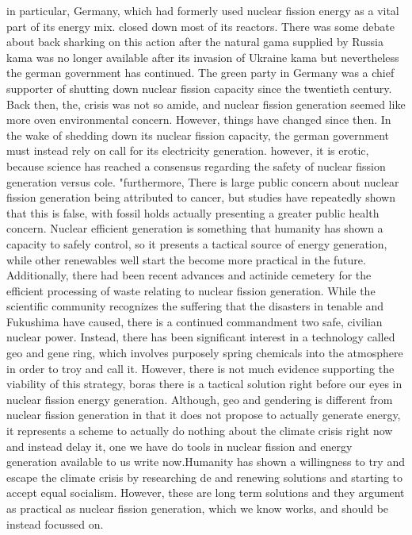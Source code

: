 \documentclass[12pt,letterpaper]{article}
\begin{document}
\begin{flushleft}
 in particular, Germany, which had formerly used nuclear fission energy as a vital part of its energy mix. closed down most of its reactors. There was some debate about back sharking on this action after the natural gama supplied by Russia kama was no longer available after its invasion of Ukraine kama but nevertheless the german government has continued. The green party in Germany was a chief supporter of shutting down nuclear fission capacity since the twentieth century. Back then, the, crisis was not so amide, and nuclear fission generation seemed like more oven environmental concern. However, things have changed since then. In the wake of shedding down its nuclear fission capacity, the german government must instead rely on call for its electricity generation. however, it is erotic, because science has reached a consensus regarding the safety of nuclear fission generation versus cole. "furthermore, There is large public concern about nuclear fission generation being attributed to cancer, but studies have repeatedly shown that this is false, with fossil holds actually presenting a greater public health concern. Nuclear efficient generation is something that humanity has shown a capacity to safely control, so it presents a tactical source of energy generation, while other renewables well start the become more practical in the future. Additionally, there had been recent advances and actinide cemetery for the efficient processing of waste relating to nuclear fission generation. While the scientific community recognizes the suffering that the disasters in tenable and Fukushima have caused, there is a continued commandment two safe, civilian nuclear power. Instead, there has been significant interest in a technology called geo and gene ring, which involves purposely spring chemicals into the atmosphere in order to troy and call it. However, there is not much evidence supporting the viability of this strategy, boras there is a tactical solution right before our eyes in nuclear fission energy generation. Although, geo and gendering is different from nuclear fission generation in that it does not propose to actually generate energy, it represents a scheme to actually do nothing about the climate crisis right now and instead delay it, one we have do tools in nuclear fission and energy generation available to us write now.Humanity has shown a willingness to try and escape the climate crisis by researching de and renewing solutions and starting to accept equal socialism. However, these are long term solutions and they argument as practical as nuclear fission generation, which we know works, and should be instead focussed on.


\end{flushleft}
\end{document}

